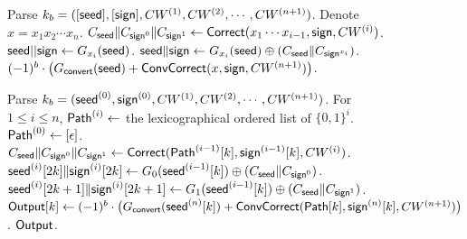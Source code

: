 \begin{figure*}
{{\begin{algorithmic}
    \State Parse $k_b = ([{\sf seed}],[{\sf sign}],CW^{(1)},CW^{(2)},\cdots,CW^{(n+1)})$. 
    \State Denote $x=x_1x_2\cdots x_n$. 
      \State $C_{\sf seed}\|C_{{\sf sign}^0}\|C_{{\sf sign}^1}\gets {\sf Correct}(x_1\cdots x_{i-1},{\sf sign},CW^{(i)})$.
      \State ${\sf seed}||{\sf sign}\gets G_{x_i}({\sf seed})$. 
      \State ${\sf seed}\|{\sf sign}\gets G_{x_i}({\sf seed})\oplus(C_{{\sf seed}}\|C_{{\sf sign}^{x_i}})$. 
    \EndFor
    \State \Return $(-1)^b\cdot \big(G_{\sf convert}({\sf seed})+{\sf ConvCorrect}(x,{\sf sign},CW^{(n+1)})\big)$. 
    \EndProcedure
    \item[]
    \State Parse $k_b=({\sf seed}^{(0)},{\sf sign}^{(0)},CW^{(1)},CW^{(2)},\cdots,CW^{(n+1)})$. 
    \State For $1\le i\le n$, ${\sf Path}^{(i)}\gets$ the lexicographical ordered list of $\{0,1\}^i$. ${\sf Path}^{(0)}\gets[\epsilon]$. 
    \State{}
        \State $C_{\sf seed}\|C_{{\sf sign}^0}\|C_{{\sf sign}^1}\gets {\sf Correct}({\sf Path}^{(i-1)}[k],{\sf sign}^{(i-1)}[k],CW^{(i)})$.
        \State ${\sf seed}^{(i)}[2k]\|{\sf sign}^{(i)}[2k]\gets G_0({\sf seed}^{(i-1)}[k])\oplus (C_{\sf seed}\|C_{{\sf sign}^0})$.
        \State ${\sf seed}^{(i)}[2k+1]\|{\sf sign}^{(i)}[2k+1]\gets G_1({\sf seed}^{(i-1)}[k])\oplus (C_{\sf seed}\|C_{{\sf sign}^1})$.
      \EndFor
    \EndFor
      \State ${\sf Output}[k]\gets (-1)^b\cdot \big(G_{\sf convert}({\sf seed}^{(n)}[k])+{\sf ConvCorrect}({\sf Path}[k],{\sf sign}^{(n)}[k],CW^{(n+1)})\big)$.
    \EndFor
    \State\Return $\sf Output$. 
    \EndProcedure
    \end{algorithmic}}}
\end{figure*}


\newpage
